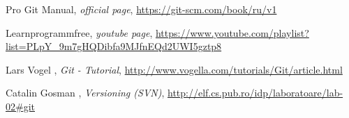 \begin{thebibliography}{99999}
\singlespace\normalsize

 Pro Git Manual, \textit{ official page}, \url{https://git-scm.com/book/ru/v1}

 Learnprogrammfree, \textit{youtube page}, \url{https://www.youtube.com/playlist?list=PLpY_9m7gHQDibfa9MJfnEQd2UWI5gztp8}

 Lars Vogel , \textit{Git - Tutorial}, \url{http://www.vogella.com/tutorials/Git/article.html}

 Catalin Gosman , \textit{Versioning (SVN)}, \url{http://elf.cs.pub.ro/idp/laboratoare/lab-02#git}
\end{thebibliography}
